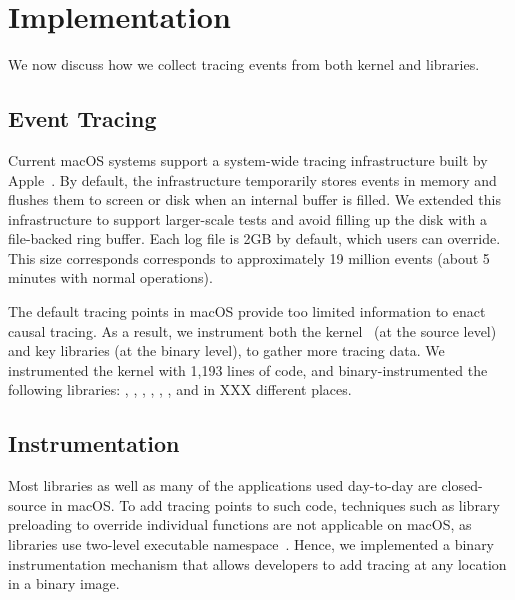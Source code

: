 \section{Implementation}\label{sec:implementation}
We now discuss how we collect tracing events from both kernel and libraries.

\subsection{Event Tracing}
Current macOS systems support a system-wide tracing infrastructure built by
Apple~\cite{linktotracetool}. By default, the infrastructure temporarily stores
events in memory and flushes them to screen or disk when an internal buffer is
filled. We extended this infrastructure to support larger-scale tests and avoid
filling up the disk with a file-backed ring buffer. Each log file is 2GB by
default, which users can override. This size corresponds corresponds to
approximately 19 million events (about 5 minutes with normal operations).

The default tracing points in macOS provide too limited information to enact
causal tracing. As a result, we instrument both the
kernel~\cite{linkofxnusourcecode} (at the source level) and key libraries (at
the binary level), to gather more tracing data. We instrumented the kernel with
1,193 lines of code, and binary-instrumented the following libraries:
, , ,
, , ,  and
 in XXX different places. 



\subsection{Instrumentation}

Most libraries as well as many of the applications used day-to-day are
closed-source in macOS. To add tracing points to such code, techniques such as
library preloading to override individual functions are not applicable on macOS,
as libraries use two-level executable namespace~\cite{twolayernamespace}. Hence,
we implemented a binary instrumentation mechanism that allows developers to add
tracing at any location in a binary image.

